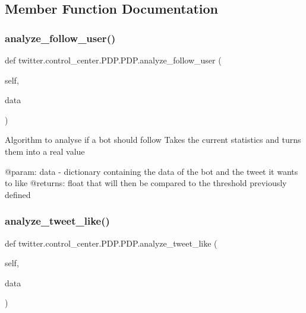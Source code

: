 \subsection{Member Function Documentation}
\mbox{\label{classtwitter_1_1control__center_1_1PDP_1_1PDP_ab9d69b04d93fc8b6fead61fd98991c22}} 
\subsubsection{\texorpdfstring{analyze\+\_\+follow\+\_\+user()}{analyze\_follow\_user()}}
{\footnotesize\ttfamily def twitter.\+control\+\_\+center.\+P\+D\+P.\+P\+D\+P.\+analyze\+\_\+follow\+\_\+user (\begin{DoxyParamCaption}\item[{}]{self,  }\item[{}]{data }\end{DoxyParamCaption})}

\begin{DoxyVerb}Algorithm to analyse if a bot should follow
Takes the current statistics and turns them into a real value

@param: data - dictionary containing the data of the bot and the tweet it wants to like
@returns: float that will then be compared to the threshold previously defined
\end{DoxyVerb}
 \mbox{\label{classtwitter_1_1control__center_1_1PDP_1_1PDP_af6e05300883ddb19bcd9c6047e000ec1}} 
\subsubsection{\texorpdfstring{analyze\+\_\+tweet\+\_\+like()}{analyze\_tweet\_like()}}
{\footnotesize\ttfamily def twitter.\+control\+\_\+center.\+P\+D\+P.\+P\+D\+P.\+analyze\+\_\+tweet\+\_\+like (\begin{DoxyParamCaption}\item[{}]{self,  }\item[{}]{data }\end{DoxyParamCaption})}

